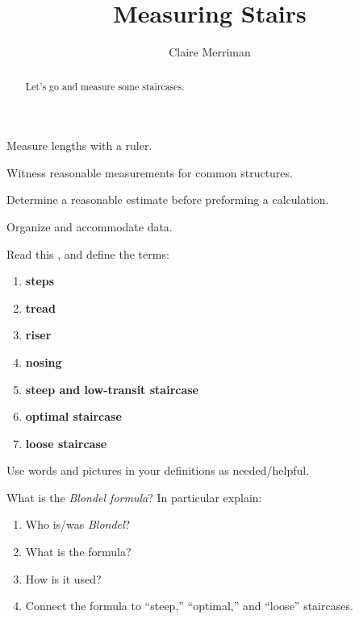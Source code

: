 \documentclass[handout,nooutcomes,noauthor,hints]{ximera}
\title{Measuring Stairs}
\author{Claire Merriman}
\begin{document}
\begin{abstract}
  Let's go and measure some staircases.
\end{abstract}
\maketitle


\begin{listOutcomes}
\item Measure lengths with a ruler.
\item Witness reasonable measurements for common structures.
\item Determine a reasonable estimate before preforming a calculation.
\item Organize and accommodate data.
\end{listOutcomes}





\begin{question}
Read this ,
and define the terms:
\begin{enumerate}
\item \textbf{steps}
\item \textbf{tread}
\item \textbf{riser}
\item \textbf{nosing}
\item \textbf{steep and low-transit staircase}
\item \textbf{optimal staircase}
\item \textbf{loose staircase}
\end{enumerate}
Use words and pictures in your definitions as needed/helpful.

\end{question}


\mynewpage

\begin{question}
  What is the \textit{Blondel formula}? In particular explain:
  \begin{enumerate}
  \item Who is/was \textit{Blondel}?
  \item What is the formula?
  \item How is it used?
  \item Connect the formula to ``steep,'' ``optimal,'' and ``loose''
    staircases.
  \end{enumerate}
\end{question}
\end{document}
